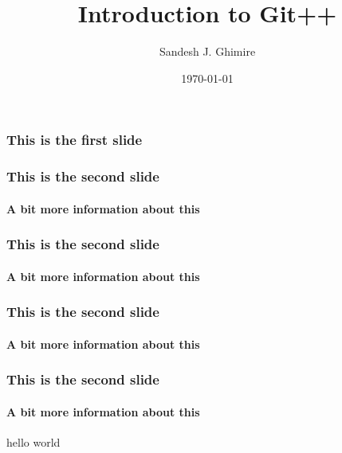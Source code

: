 \documentclass{beamer}
\title{Introduction to Git++}
\author{Sandesh J. Ghimire}
\date{\today}
\begin{document}
\frame{\titlepage}

  \begin{frame}
    \frametitle{This is the first slide}
  \end{frame}
  
  
  \begin{frame}
    \frametitle{This is the second slide}
    \framesubtitle{A bit more information about this}
  \end{frame}
  
    \begin{frame}
    \frametitle{This is the second slide}
    \framesubtitle{A bit more information about this}
  \end{frame}
  
    \begin{frame}
    \frametitle{This is the second slide}
    \framesubtitle{A bit more information about this}
  \end{frame}
  
  
  \begin{frame}
    \frametitle{This is the second slide}
    \framesubtitle{A bit more information about this}
    
    \begin{theorem}
    hello world 
    \end{theorem}
    
    
    
  \end{frame}

\end{document}
